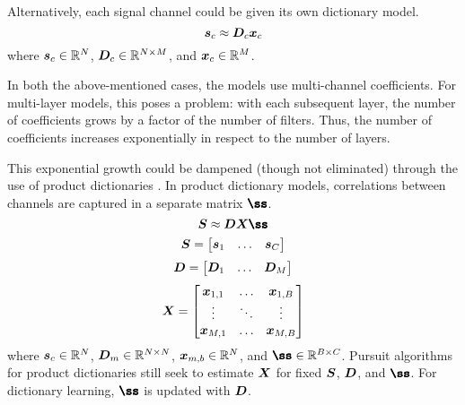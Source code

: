 Alternatively, each signal channel could be given its own dictionary model.
%
\begin{equation}
\bm{s}_c \approx \bm{D}_c\bm{x}_c
\end{equation}
%
where $\bm{s}_c \in \mathbb{R}^N$, $\bm{D}_c \in \mathbb{R}^{N \times M}$, and $\bm{x}_{c} \in \mathbb{R}^M$.

In both the above-mentioned cases, the models use multi-channel coefficients. For multi-layer models, this poses a problem: with each subsequent layer, the number of coefficients grows by a factor of the number of filters. Thus, the number of coefficients increases exponentially in respect to the number of layers.

This exponential growth could be dampened (though not eliminated) through the use of product dictionaries \cite{garcia2018multichannel}. In product dictionary models, correlations between channels are captured in a separate matrix $\mSS$.
%
\begin{equation}
\mS \approx \mD\mX\mSS
\end{equation}
\begin{equation}
\bm{S} = \begin{bmatrix} \bm{s}_1 & \hdots & \bm{s}_C \end{bmatrix}
\end{equation}
\begin{equation}
\bm{D} = \begin{bmatrix} \bm{D}_1 & \hdots & \bm{D}_M \end{bmatrix}
\end{equation}
\begin{equation}
\bm{X} = \begin{bmatrix} \bm{x}_{1,1} & \hdots & \bm{x}_{1,B} \\ \vdots & \ddots & \vdots \\ \bm{x}_{M,1} & \hdots & \bm{x}_{M,B} \end{bmatrix}
\end{equation}
%
where $\bm{s}_c \in \mathbb{R}^N$, $\bm{D}_m \in \mathbb{R}^{N \times N}$, $\bm{x}_{m,b} \in \mathbb{R}^N$, and $\mSS \in \R^{B \times C}$. Pursuit algorithms for product dictionaries still seek to estimate $\bm{X}$ for fixed $\bm{S}$, $\bm{D}$, and $\mSS$. For dictionary learning, $\mSS$ is updated with $\bm{D}$.

